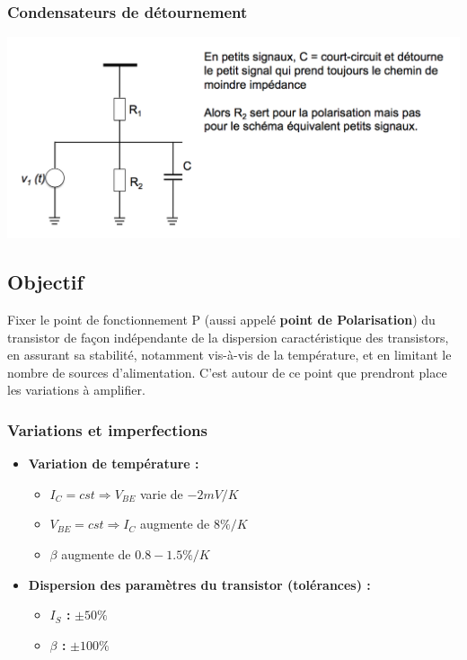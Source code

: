 \documentclass[]{article}
\begin{document}
\subsubsection{Condensateurs de détournement}
\includegraphics[scale=0.5]{det}

\subsection{Objectif}
Fixer le point de fonctionnement P (aussi appelé \textbf{point de Polarisation}) du transistor de façon indépendante de la dispersion caractéristique des transistors, en assurant sa stabilité, notamment vis-à-vis de la température, et en limitant le nombre de sources d'alimentation. C'est autour de ce point que prendront place les variations à amplifier.

\subsubsection{Variations et imperfections}
\begin{itemize}
\item \textbf{Variation de température :}

\begin{itemize}
\item $I_C = cst \Rightarrow V_{BE}$ varie de $ -2mV/K$ 
\item  $V_{BE} = cst \Rightarrow I_{C}$ augmente de $ 8\%/K$ 
\item $\beta$ augmente de $ 0.8-1.5\%/K$  
 
\end{itemize}


\item \textbf{Dispersion des paramètres du transistor (tolérances) :}

\begin{itemize}
\item \textbf{$I_S$ :} $\pm 50\%$
\item \textbf{$\beta$ :} $\pm 100\%$
\end{itemize}

\end{itemize}
\end{document}
